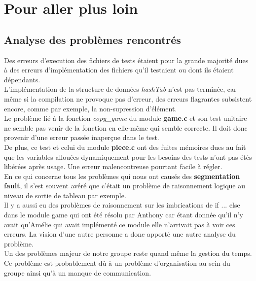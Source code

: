 \documentclass{report}
\begin{document}
\chapter{Pour aller plus loin}
\setcounter{section}{0}
\section{Analyse des problèmes rencontrés}
Des erreurs d'execution des fichiers de tests étaient pour la grande majorité dues à des erreurs d'implémentation des fichiers qu'il testaient ou dont ils étaient dépendants.\\
L'implémentation de la structure de données \textit{hashTab} n'est pas terminée, car même si la compilation ne provoque pas d'erreur, des erreurs flagrantes subsistent encore, comme par exemple, la non-supression d'élément.\\
Le problème lié à la fonction \textit{copy\_game} du module \textbf{game.c} et son test unitaire ne semble pas venir de la fonction en elle-même qui semble correcte. Il doit donc provenir d'une erreur passée inaperçue dans le test.\\
De plus, ce test et celui du module \textbf{piece.c} ont des fuites mémoires dues au fait que les variables allouées dynamiquement pour les besoins des tests n'ont pas étés libérées après usage. Une erreur malencontreuse pourtant facile à régler.\\
En ce qui concerne tous les problèmes qui nous ont causés des \textbf{segmentation fault}, il s'est souvent avéré que c'était un problème de raisonnement logique au niveau de sortie de tableau par exemple.\\
Il y a aussi eu des problèmes de raisonnement sur les imbrications de if ... else dans le module game qui ont été résolu par Anthony car étant donnée qu'il n'y avait qu'Amélie qui avait implémenté ce module elle n'arrivait pas à voir ces erreurs. La vision d'une autre personne a donc apporté une autre analyse du problème.\\
Un des problèmes majeur de notre groupe reste quand même la gestion du temps. Ce problème est probablement dû à un problème d'organisation au sein du groupe ainsi qu'à un manque de communication.
\end{document}
